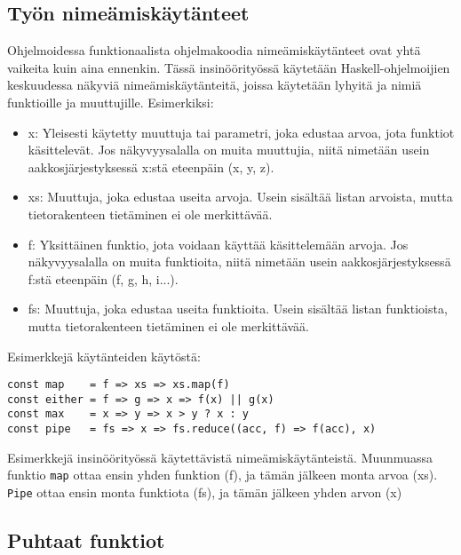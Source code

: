 \subsection{Työn nimeämiskäytänteet}

Ohjelmoidessa funktionaalista ohjelmakoodia nimeämiskäytänteet ovat yhtä vaikeita kuin aina ennenkin. Tässä insinöörityössä käytetään Haskell-ohjelmoijien keskuudessa näkyviä nimeämiskäytänteitä, joissa käytetään lyhyitä ja  nimiä funktioille ja muuttujille. Esimerkiksi:

\begin{itemize}
    \item x: Yleisesti käytetty muuttuja tai parametri, joka edustaa arvoa, jota funktiot käsittelevät. Jos näkyvyysalalla on muita muuttujia, niitä nimetään usein aakkosjärjestyksessä x:stä eteenpäin (x, y, z).
    \item xs: Muuttuja, joka edustaa useita arvoja. Usein sisältää listan arvoista, mutta tietorakenteen tietäminen ei ole merkittävää.
    \item f: Yksittäinen funktio, jota voidaan käyttää käsittelemään arvoja. Jos näkyvyysalalla on muita funktioita, niitä nimetään usein aakkosjärjestyksessä f:stä eteenpäin (f, g, h, i...).
    \item fs: Muuttuja, joka edustaa useita funktioita. Usein sisältää listan funktioista, mutta tietorakenteen tietäminen ei ole merkittävää.
\end{itemize}

Esimerkkejä käytänteiden käytöstä:

\begin{code}
    \begin{verbatim}
const map    = f => xs => xs.map(f)
const either = f => g => x => f(x) || g(x)
const max    = x => y => x > y ? x : y
const pipe   = fs => x => fs.reduce((acc, f) => f(acc), x)
\end{verbatim}
    \caption{Esimerkkejä insinöörityössä käytettävistä nimeämiskäytänteistä. Muunmuassa funktio \texttt{map} ottaa ensin yhden funktion (f), ja tämän jälkeen monta arvoa (xs). \texttt{Pipe} ottaa ensin monta funktiota (fs), ja tämän jälkeen yhden arvon (x)}
    \label{code:javascript_naming_convention_example}
\end{code}

\subsection{Puhtaat funktiot}

